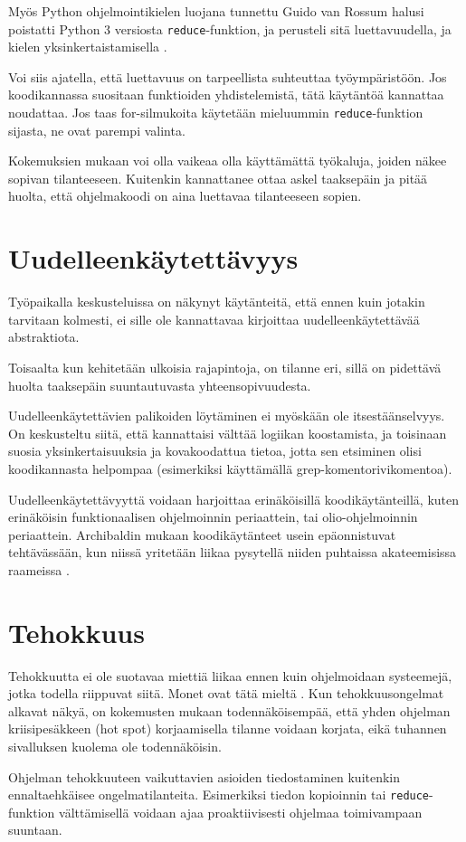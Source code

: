 Myös Python ohjelmointikielen luojana tunnettu Guido van Rossum halusi poistatti Python 3 versiosta \texttt{reduce}-funktion, ja perusteli sitä luettavuudella, ja kielen yksinkertaistamisella \cite{vanrossum2008reduce}.

Voi siis ajatella, että luettavuus on tarpeellista suhteuttaa työympäristöön. Jos koodikannassa suositaan funktioiden yhdistelemistä, tätä käytäntöä kannattaa noudattaa. Jos taas for-silmukoita käytetään mieluummin \texttt{reduce}-funktion sijasta, ne ovat parempi valinta.

Kokemuksien mukaan voi olla vaikeaa olla käyttämättä työkaluja, joiden näkee sopivan tilanteeseen. Kuitenkin kannattanee ottaa askel taaksepäin ja pitää huolta, että ohjelmakoodi on aina luettavaa tilanteeseen sopien.

\section{Uudelleenkäytettävyys}

Työpaikalla keskusteluissa on näkynyt käytänteitä, että ennen kuin jotakin tarvitaan kolmesti, ei sille ole kannattavaa kirjoittaa uudelleenkäytettävää abstraktiota.

Toisaalta kun kehitetään ulkoisia rajapintoja, on tilanne eri, sillä on pidettävä huolta taaksepäin suuntautuvasta yhteensopivuudesta.

Uudelleenkäytettävien palikoiden löytäminen ei myöskään ole itsestäänselvyys. On keskusteltu siitä, että kannattaisi välttää logiikan koostamista, ja toisinaan suosia yksinkertaisuuksia ja kovakoodattua tietoa, jotta sen etsiminen olisi koodikannasta helpompaa (esimerkiksi käyttämällä grep-komentorivikomentoa).

Uudelleenkäytettävyyttä voidaan harjoittaa erinäköisillä koodikäytänteillä, kuten erinäköisin funktionaalisen ohjelmoinnin periaattein, tai olio-ohjelmoinnin periaattein. Archibaldin mukaan koodikäytänteet usein epäonnistuvat tehtävässään, kun niissä yritetään liikaa pysytellä niiden puhtaissa akateemisissa raameissa \cite{pennane_fp_gist}.



\section{Tehokkuus}
Tehokkuutta ei ole suotavaa miettiä liikaa ennen kuin ohjelmoidaan systeemejä, jotka todella riippuvat siitä. Monet ovat tätä mieltä \cite{pennane_fp_gist,prematureoptimization}. Kun tehokkuusongelmat alkavat näkyä, on kokemusten mukaan todennäköisempää, että yhden ohjelman kriisipesäkkeen (hot spot) korjaamisella tilanne voidaan korjata, eikä tuhannen sivalluksen kuolema ole todennäköisin.

Ohjelman tehokkuuteen vaikuttavien asioiden tiedostaminen kuitenkin ennaltaehkäisee ongelmatilanteita. Esimerkiksi tiedon kopioinnin tai \texttt{reduce}-funktion välttämisellä voidaan ajaa proaktiivisesti ohjelmaa toimivampaan suuntaan.

